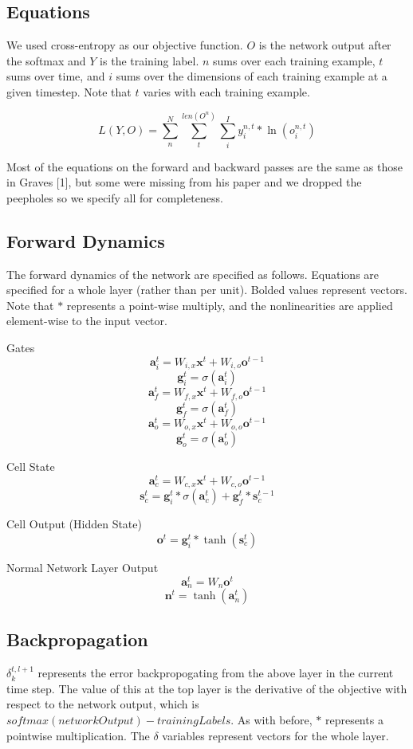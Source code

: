 \documentclass[11pt]{article}
\begin{document}
\subsection{Equations}

We used cross-entropy as our objective function. \(O\) is the network
output after the softmax and \(Y\) is the training label. \(n\) sums over each
training example, \(t\) sums over time, and \(i\) sums over the dimensions
of each training example at a given timestep.
Note that \(t\) varies with each training example.

\[  L(Y, O) = \sum_{n}^{N}  \sum_{t}^{len(O^{n})} \sum_{i}^{I} y_{i}^{n,t}*\ln(o_{i}^{n,t}) \]

Most of the equations on the forward and backward passes are the
same as those in Graves [1], but some were missing from his paper
and we dropped the peepholes so we specify all for completeness.

\subsection{Forward Dynamics}
The forward dynamics of the network are specified as follows. Equations
are specified for a whole layer (rather than per unit).
 Bolded values represent vectors. Note that \(*\)
represents a point-wise multiply, and the nonlinearities are applied
element-wise to the input vector.

Gates
\[ \textbf{a}_{i}^{t} = W_{i,x}\textbf{x}^{t} +  W_{i,o}\textbf{o}^{t-1} \] 
\[ \textbf{g}_{i}^{t} = \sigma( \textbf{a}_{i}^{t}) \]
\[ \textbf{a}_{f}^{t} = W_{f,x}\textbf{x}^{t} +  W_{f,o}\textbf{o}^{t-1} \] 
\[ \textbf{g}_{f}^{t} = \sigma( \textbf{a}_{f}^{t}) \]
\[ \textbf{a}_{o}^{t} = W_{o,x}\textbf{x}^{t} +  W_{o,o}\textbf{o}^{t-1} \] 
\[ \textbf{g}_{o}^{t} = \sigma( \textbf{a}_{o}^{t}) \]

Cell State
\[ \textbf{a}_{c}^{t} = W_{c,x}\textbf{x}^{t} +  W_{c,o}\textbf{o}^{t-1} \] 
\[ \textbf{s}_{c}^{t} =  \textbf{g}_{i}^{t} * \sigma( \textbf{a}_{c}^{t}) + \textbf{g}_{f}^{t}*\textbf{s}_{c}^{t-1} \]

Cell Output (Hidden State)
\[ \textbf{o}^{t} =  \textbf{g}_{i}^{t} * \tanh( \textbf{s}_{c}^{t}) \]

Normal Network Layer Output
\[ \textbf{a}_{n}^{t} = W_{n}\textbf{o}^{t} \]
\[ \textbf{n}^{t} = \tanh( \textbf{a}_{n}^{t}) \]

\subsection{Backpropagation}
\(\delta_{k}^{t,l+1}\) represents the error backpropogating from the above layer
in the current time step. The value of this at the top layer is the 
derivative of the objective with respect to the network output, which
is \(softmax(networkOutput)-trainingLabels\).
As with before, \(*\) represents a pointwise multiplication. The \(\delta\) variables
represent vectors for the whole layer.
\end{document}
